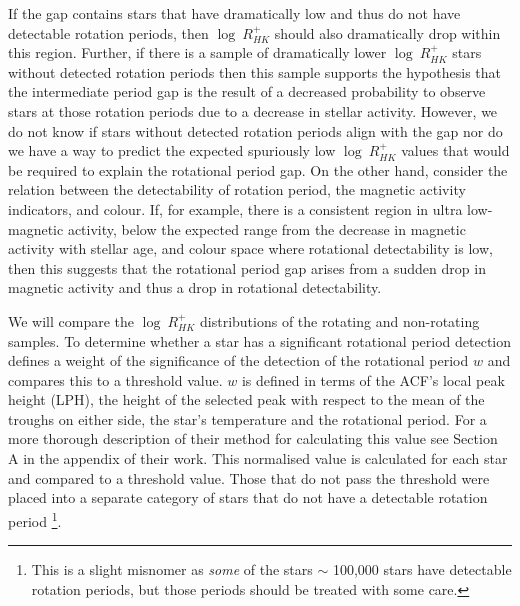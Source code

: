 If the gap contains stars that have dramatically low \rper{} and thus do not have detectable rotation periods, then $\log \ R^{+}_{HK}$ should also dramatically drop within this region.
Further, if there is a sample of dramatically lower $\log \ R^{+}_{HK}$ stars without detected rotation periods then this sample supports the hypothesis that the intermediate period gap is the result of a decreased probability to observe stars at those rotation periods due to a decrease in stellar activity.
However, we do not know if stars without detected rotation periods align with the gap nor do we have a way to predict the expected spuriously low $\log \ R^{+}_{HK}$ values that would be required to explain the rotational period gap.
On the other hand, consider the relation between the detectability of rotation period, the magnetic activity indicators, and colour.
If, for example, there is a consistent region in ultra low-magnetic activity, below the expected range from the decrease in magnetic activity with stellar age, and colour space where rotational detectability is low, then this suggests that the rotational period gap arises from a sudden drop in magnetic activity and thus a drop in rotational detectability.

We will compare the $\log \ R^{+}_{HK}$  distributions of the \citet{mcquillan_rotation_2014} rotating and non-rotating samples.
To determine whether a star has a significant rotational period detection \citet{mcquillan_rotation_2014} defines a weight of the significance of the detection of the rotational period $w$ and compares this to a threshold value.
$w$ is defined in terms of the ACF's local peak height (LPH), the height of the selected peak with respect to the mean of the troughs on either side, the star's temperature and the rotational period.
For a more thorough description of their method for calculating this value see Section A in the appendix of their work.
This normalised value is calculated for each star and compared to a threshold value.
Those that do not pass the threshold were placed into a separate category of stars that do not have a detectable rotation period \footnote{This is a slight misnomer as \textit{some} of the stars $\sim$ 100,000 stars have detectable rotation periods, but those periods should be treated with some care.}.

